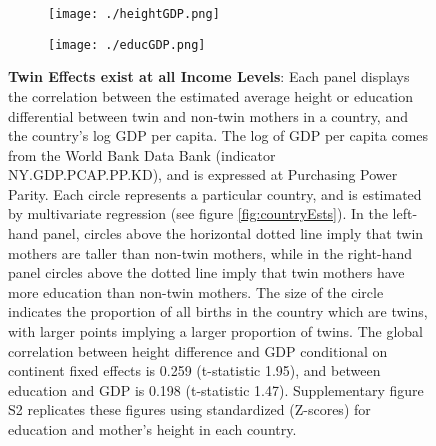\documentclass{nature}
\begin{document}
\begin{linenumbers}
\begin{spacing}{1}
\begin{figure}[htpb!]
\begin{subfigure}{.5\textwidth}
  \texttt{[image: ./heightGDP.png]}
\end{subfigure}%
\begin{subfigure}{.5\textwidth}
  \texttt{[image: ./educGDP.png]}
\end{subfigure}
\vspace{5mm}
\caption{\textbf{Twin Effects exist at all Income Levels}: {\footnotesize Each panel displays the correlation between the estimated average height or education differential between twin and non-twin mothers in a country, and the country's log GDP per capita. The log of GDP per capita comes from the World Bank Data Bank (indicator NY.GDP.PCAP.PP.KD), and is expressed at Purchasing Power Parity.  Each circle represents a particular country, and is estimated by multivariate regression (see figure \ref{fig:countryEsts}).  In the left-hand panel, circles above the horizontal dotted line imply that twin mothers are taller than non-twin mothers, while in the right-hand panel circles above the dotted line imply that twin mothers have more education than non-twin mothers. The size of the circle indicates the proportion of all births in the country which are twins, with larger points implying a larger proportion of twins. The global correlation between height difference and GDP conditional on continent fixed effects is 0.259 (t-statistic 1.95), and between education and GDP is 0.198 (t-statistic 1.47). Supplementary figure S2 replicates these figures using standardized (Z-scores) for education and mother's height in each country.}}
\label{fig:GDPEsts}
\end{figure}




\end{spacing}
\end{linenumbers}
\end{document}
